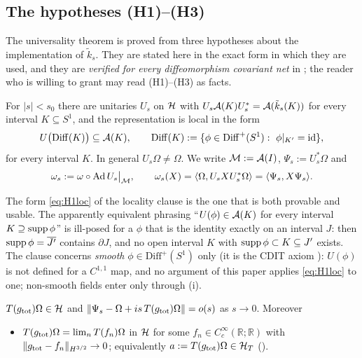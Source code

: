 \subsection{The hypotheses (H1)--(H3)}\label{ss:hyp}

The universality theorem is proved from three hypotheses about the implementation of $\tilde k_s$.  They are
stated here in the exact form in which they are used, and they are \emph{verified for every diffeomorphism
covariant net} in ; the reader who is willing to grant  may read
(H1)--(H3) as facts.

\begin{hypothesis}[implementation]\label{H1}
For $|s|<s_{0}$ there are unitaries $U_{s}$ on $\mathcal H$ with
$U_{s}\mathcal A(K)U_{s}^{*}=\mathcal A(\tilde k_{s}(K))$ for every interval $K\subseteq S^{1}$, and the representation is
local in the form
\begin{equation}\label{eq:H1loc}
 U\bigl(\mathrm{Diff}(K)\bigr)\subseteq\cA(K),\qquad
 \mathrm{Diff}(K):=\{\phi\in\mathrm{Diff}^{+}(S^{1}):\ \phi|_{K'}=\mathrm{id}\},
\end{equation}
for every interval $K$.  In general $U_{s}\Omega\neq\Omega$.  We write $\mathcal M:=\mathcal A(I)$,
$\Psi_{s}:=U_{s}^{*}\Omega$ and
\begin{equation}\label{eq:omegas}
 \omega_{s}:=\omega\circ\operatorname{Ad} U_{s}\big|_{\mathcal M},\qquad
 \omega_{s}(X)=\langle\Omega,U_{s}XU_{s}^{*}\Omega\rangle=\langle\Psi_{s},X\Psi_{s}\rangle .
\end{equation}
\end{hypothesis}

The form \eqref{eq:H1loc} of the locality clause is the one that is both provable and usable.  The
apparently equivalent phrasing ``$U(\phi)\in\mathcal A(K)$ for every interval $K\supseteq\operatorname{supp}\phi$'' is ill-posed
for a $\phi$ that is the identity exactly on an interval $J$: then $\operatorname{supp}\phi=\overline{J'}$ contains $\partial J$,
and no open interval $K$ with $\operatorname{supp}\phi\subset K\subseteq J'$ exists.  The clause concerns \emph{smooth}
$\phi\in\mathrm{Diff}^{+}(S^{1})$ only (it is the CDIT axiom \cite[\S4]{CDIT}): $U(\phi)$ is not defined for a
$C^{1,1}$ map, and no argument of this paper applies \eqref{eq:H1loc} to one; non-smooth fields enter only
through (i).

\begin{hypothesis}\label{H2}
$T(g_{\rm tot})\Omega\in\mathcal H$ and $\|\Psi_{s}-\Omega+is\,T(g_{\rm tot})\Omega\|=o(s)$ as $s\to0$.
Moreover
\begin{itemize}
\item[(H2$'$)] $T(g_{\rm tot})\Omega=\lim_{n}T(f_{n})\Omega$ in $\mathcal H$ for some $f_{n}\in
 C_{c}^{\infty}(\mathbb R;\mathbb R)$ with $\|g_{\rm tot}-f_{n}\|_{H^{3/2}}\to0$; equivalently
 $a:=T(g_{\rm tot})\Omega\in\mathcal H_T$ \textup{(}\textup{)}.
\end{itemize}
\end{hypothesis}


